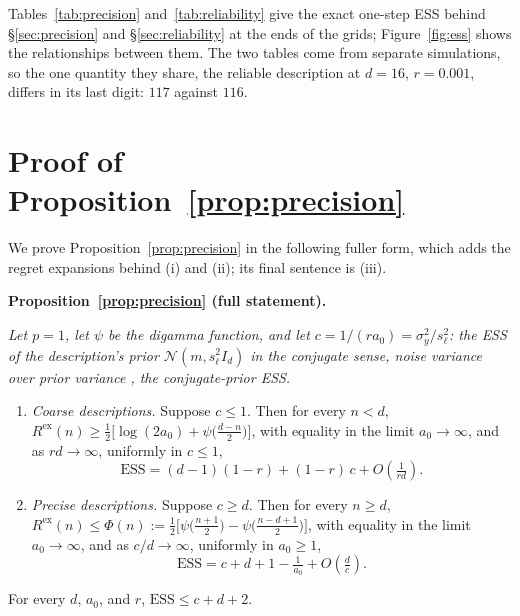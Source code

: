 \documentclass[10pt]{article}
\newcommand{\ess}{\mathrm{ESS}}
\begin{document}
Tables~\ref{tab:precision} and~\ref{tab:reliability} give the exact one-step ESS behind \S\ref{sec:precision} and \S\ref{sec:reliability} at the ends of the grids; Figure~\ref{fig:ess} shows the relationships between them. The two tables come from separate simulations, so the one quantity they share, the reliable description at $d = 16$, $r = 0.001$, differs in its last digit: $117$ against $116$.

\begin{table}[h]
\centering\small
\caption{Exact ESS of a reliable description ($p=1$) for $a_0=10$, three seeds (standard deviation across seeds below 2\% of each value), against the rule $(d-1)(1-r) + 1/(r a_0)$ of~\eqref{eq:additive}, which is within $2.2$ examples of every cell.}
\label{tab:precision}

\end{table}

\begin{table}[h]
\centering\small
\caption{ESS of unreliable descriptions ($d=16$, $a_0=10$), three seeds; standard deviation across seeds at most 2\% of each value. Down a column precision rises tenfold per row; across a row the description is wrong never, one time in a hundred, and one time in ten.}
\label{tab:reliability}

\end{table}

\section{Proof of Proposition~\ref{prop:precision}}\label{app:precision}

We prove Proposition~\ref{prop:precision} in the following fuller form, which adds the regret expansions behind (i) and (ii); its final sentence is (iii).

\medskip\noindent\textbf{Proposition~\ref{prop:precision} (full statement).} {\itshape Let $p = 1$, let $\psi$ be the digamma function, and let $c = 1/(r a_0) = \sigma_y^2 / s_\ell^2$: the ESS of the description's prior $\mathcal{N}(m, s_\ell^2 I_d)$ in the conjugate sense, noise variance over prior variance \citep{neuenschwander2020}, the conjugate-prior ESS.
\begin{enumerate}
\item[(i)] \emph{Coarse descriptions.} Suppose $c \le 1$. Then for every $n < d$,
$R^{\mathrm{ex}}(n) \ge \tfrac12\big[\log(2a_0) + \psi\big(\tfrac{d-n}{2}\big)\big]$, with equality in the limit $a_0 \to \infty$, and as $rd \to \infty$, uniformly in $c \le 1$,
\[
\ess = (d-1)(1-r) + (1-r)\,c + O\!\left(\tfrac{1}{rd}\right).
\]
\item[(ii)] \emph{Precise descriptions.} Suppose $c \ge d$. Then for every $n \ge d$,
$R^{\mathrm{ex}}(n) \le \Phi(n) := \tfrac12\big[\psi\big(\tfrac{n+1}{2}\big) - \psi\big(\tfrac{n-d+1}{2}\big)\big]$, with equality in the limit $a_0 \to \infty$, and as $c/d \to \infty$, uniformly in $a_0 \ge 1$,
\[
\ess = c + d + 1 - \tfrac{1}{a_0} + O\!\left(\tfrac{d}{c}\right).
\]
\end{enumerate}
For every $d$, $a_0$, and $r$, $\ess \le c + d + 2$.}
\medskip
\end{document}

